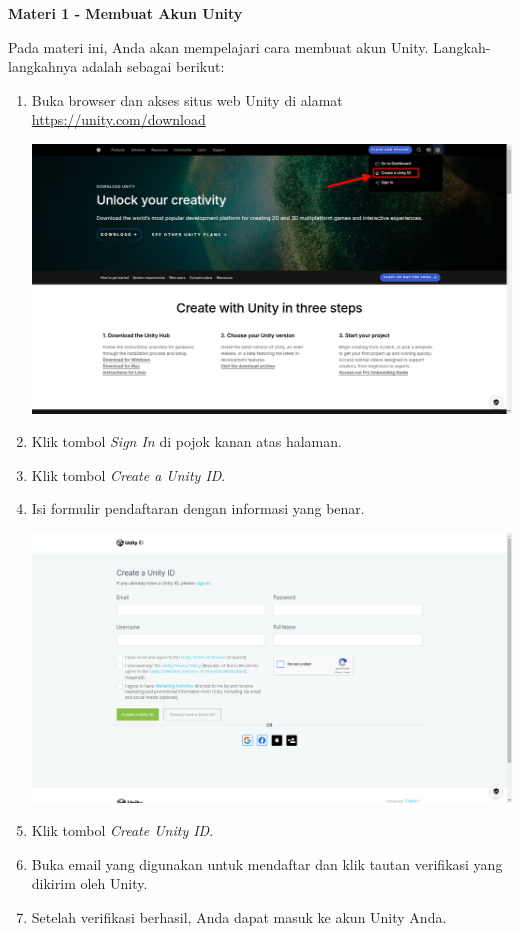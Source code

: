 \documentclass{article}
\begin{document}
    \begin{flushleft}
        \textbf{Materi 1 - Membuat Akun Unity}
        \newline

        Pada materi ini, Anda akan mempelajari cara membuat akun Unity. Langkah-langkahnya adalah sebagai berikut:

        \begin{enumerate}
            \item Buka browser dan akses situs web Unity di alamat \href{https://unity.com/download}{https://unity.com/download}
            
            \includegraphics[scale=0.3]{01_singup_menu.png}

            \item Klik tombol \textit{Sign In} di pojok kanan atas halaman.
            \item Klik tombol \textit{Create a Unity ID}.
            \item Isi formulir pendaftaran dengan informasi yang benar.

            \includegraphics[scale=0.3]{02_create_account.png}

            \item Klik tombol \textit{Create Unity ID}.
            \item Buka email yang digunakan untuk mendaftar dan klik tautan verifikasi yang dikirim oleh Unity.
            \item Setelah verifikasi berhasil, Anda dapat masuk ke akun Unity Anda.
        \end{enumerate}
    \end{flushleft}
\end{document}

